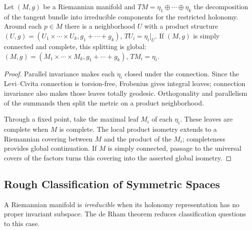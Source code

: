 \begin{theorem}
  \label{thm:pet-ch10-de-rham-decomposition}

  Let $(M,g)$ be a Riemannian manifold and $TM=\eta_1\oplus\cdots\oplus\eta_k$
  the decomposition of the tangent bundle into irreducible components for the
  restricted holonomy. Around each $p\in M$ there is a neighborhood $U$ with a
  product structure $(U,g)=(U_1\times\cdots\times U_k,g_1+\cdots+g_k)$,
  $TU_i=\eta_i|_U$. If $(M,g)$ is simply connected and complete, this splitting
  is global: $(M,g)=(M_1\times\cdots\times M_k,g_1+\cdots+g_k)$, $TM_i=\eta_i$.
\end{theorem}
\begin{proof}
  \sketch
  Parallel invariance makes each $\eta_i$ closed under the connection. Since
  the Levi--Civita connection is torsion-free, Frobenius gives integral leaves;
  connection invariance also makes those leaves totally geodesic. Orthogonality
  and parallelism of the summands then split the metric on a product
  neighborhood.

  Through a fixed point, take the maximal leaf $M_i$ of each $\eta_i$. These
  leaves are complete when $M$ is complete. The local product isometry extends
  to a Riemannian covering between $M$ and the product of the $M_i$; completeness
  provides global continuation. If $M$ is simply connected, passage to the
  universal covers of the factors turns this covering into the asserted global
  isometry.
\end{proof}

\subsection{Rough Classification of Symmetric Spaces}

A Riemannian manifold is \emph{irreducible} when its holonomy representation
has no proper invariant subspace. The de Rham theorem reduces classification
questions to this case.

